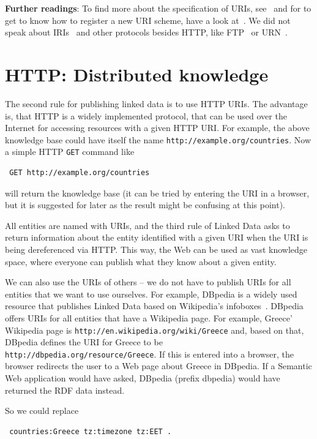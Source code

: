 \documentclass{IOS-Book-Article}
\begin{document}
\medskip

\textbf{Further readings}:
To find more about the specification of URIs, see~\cite{uri} and for to get to know how to register a new URI scheme, have a look at~\cite{uri-registration}.
We did not speak about IRIs~\cite{iri} and other protocols besides HTTP, like FTP~\cite{ftp} or URN~\cite{urn}.

\section{HTTP: Distributed knowledge}
\label{http}

The second rule for publishing linked data is to use HTTP URIs.
The advantage is, that HTTP is a widely implemented protocol, that can be used over the Internet for accessing resources with a given HTTP URI.
For example, the above knowledge base could have itself the name \texttt{http://example.org/countries}.
Now a simple HTTP \texttt{GET} command like

\begin{verbatim}
 GET http://example.org/countries
\end{verbatim}

will return the knowledge base (it can be tried by entering the URI in a browser, but it is suggested for later as the result might be confusing at this point).

All entities are named with URIs, and the third rule of Linked Data asks to return information about the entity identified with a given URI when the URI is being dereferenced via HTTP.
This way, the Web can be used as vast knowledge space, where everyone can publish what they know about a given entity.

We can also use the URIs of others -- we do not have to publish URIs for all entities that we want to use ourselves.
For example, DBpedia is a widely used resource that publishes Linked Data based on Wikipedia's infoboxes~\cite{dbpedia}.
DBpedia offers URIs for all entities that have a Wikipedia page.
For example, Greece' Wikipedia page is \texttt{http://en.wikipedia.org/wiki/Greece} and, based on that, DBpedia defines the URI for Greece to be \texttt{http://dbpedia.org/resource/Greece}.
If this is entered into a browser, the browser redirects the user to a Web page about Greece in DBpedia.
If a Semantic Web application would have asked, DBpedia (prefix dbpedia) would have returned the RDF data instead.

So we could replace

\begin{verbatim}
 countries:Greece tz:timezone tz:EET .
\end{verbatim}
\end{document}
